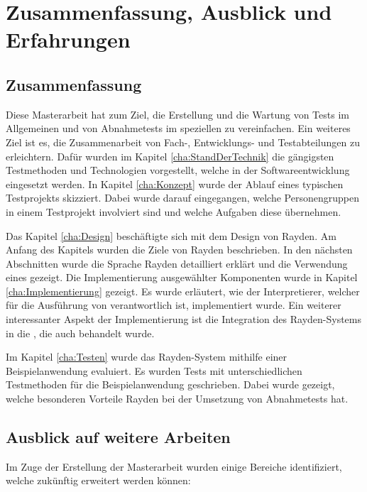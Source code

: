 \chapter{Zusammenfassung, Ausblick und Erfahrungen}
\label{cha:Zusammenfassung}

\section{Zusammenfassung}
Diese Masterarbeit hat zum Ziel, die Erstellung und die Wartung von Tests im Allgemeinen und von Abnahmetests im speziellen zu vereinfachen. Ein weiteres Ziel ist es, die Zusammenarbeit von Fach-, Entwicklungs- und Testabteilungen zu erleichtern. Dafür wurden im Kapitel \ref{cha:StandDerTechnik} die gängigsten Testmethoden und Technologien vorgestellt, welche in der Softwareentwicklung eingesetzt werden. In Kapitel \ref{cha:Konzept} wurde der Ablauf eines typischen Testprojekts skizziert. Dabei wurde darauf eingegangen, welche Personengruppen in einem Testprojekt involviert sind und welche Aufgaben diese übernehmen. 

\SuperPar
Das Kapitel \ref{cha:Design} beschäftigte sich mit dem Design von Rayden. Am Anfang des Kapitels wurden die Ziele von Rayden beschrieben. In den nächsten Abschnitten wurde die Sprache Rayden detailliert erklärt und die Verwendung eines  gezeigt. Die Implementierung ausgewählter Komponenten wurde in Kapitel \ref{cha:Implementierung} gezeigt. Es wurde erläutert, wie der Interpretierer, welcher für die Ausführung von  verantwortlich ist, implementiert wurde. Ein weiterer interessanter Aspekt der Implementierung ist die Integration des Rayden-Systems in die , die auch behandelt wurde. 

\SuperPar
Im Kapitel \ref{cha:Testen} wurde das Rayden-System mithilfe einer Beispielanwendung evaluiert. Es wurden Tests mit unterschiedlichen Testmethoden für die Beispielanwendung geschrieben. Dabei wurde gezeigt, welche besonderen Vorteile Rayden bei der Umsetzung von Abnahmetests hat.

\pagebreak
\section{Ausblick auf weitere Arbeiten}

Im Zuge der Erstellung der Masterarbeit wurden einige Bereiche identifiziert, welche zukünftig erweitert werden können:\\

